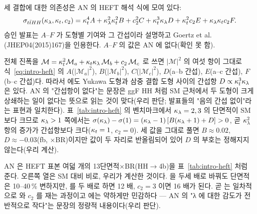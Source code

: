 세 결합에 대한 의존성은 AN 의 HEFT 해석 식에 모여 있다:
\begin{equation}
  \sigma_{t\bar{t}HH}(\kappa_{\lambda},\kappa_{t},c_2) = \kappa_{t}^{4}A + \kappa_{\lambda}^{2}\kappa_{t}^{2}B + c_2^{2}C + \kappa_{t}^{3}\kappa_{\lambda} D + \kappa_{t}^{2}c_2E + \kappa_{\lambda}\kappa_{t} c_2F .
  \label{eq:intro-heft}
\end{equation}
승인 발표는 $A$--$F$ 가 도형별 기여와 그 간섭이라 설명하고 Goertz et al.(JHEP04(2015)167)을 인용한다. $A$--$F$ 의 값은 AN 에 없다(확인 못 함).

\begin{note}
전체 진폭을 $\mathcal{M}=\kappa_{t}^{2}\mathcal{M}_a+\kappa_{t}\kappa_{\lambda}\,\mathcal{M}_b+c_2\,\mathcal{M}_c$ 로 쓰면 $|\mathcal{M}|^{2}$ 의 여섯 항이 그대로 식~\eqref{eq:intro-heft} 의
$A$($|\mathcal{M}_a|^2$), $B$($|\mathcal{M}_b|^2$), $C$($|\mathcal{M}_c|^2$), $D$(a–b 간섭), $E$(a–c 간섭), $F$(b–c 간섭)다. 따라서 \ttHH 에도 Yukawa 도형과
삼중 결합 도형 사이의 간섭항 $D\propto\kappa_{t}^{3}\kappa_{\lambda}$ 은 있다. AN 의 "간섭항이 없다"는 문장은 ggF HH 처럼 SM 근처에서 두 도형이 크게 상쇄하는 일이
없다는 뜻으로 읽는 것이 맞다(우리 판단; 발표들의 "음의 간섭 없이"라는 표현과 일치한다). 표~\ref{tab:intro-heft} 의 벤치마크에서 $\kappa_{\lambda}=2,3$ 의
단면적이 SM 보다 크므로 $\kappa_{\lambda}>1$ 쪽에서는 $\sigma(\kappa_{\lambda})-\sigma(1)=(\kappa_{\lambda}-1)\,[B(\kappa_{\lambda}+1)+D]>0$, 곧 $\kappa_{\lambda}^{2}$ 항의 증가가 간섭항보다 크다($\kappa_{t}=1$, $c_2=0$).
세 값을 그대로 풀면 $B\approx0.02$, $D\approx-0.03$(fb, $\times$BR)이지만 값이 두 자리로 반올림되어 있어 $D$ 의 부호는 정해지지 않는다(우리 계산).
\end{note}

AN 은 HEFT 표본 여덟 개의 13\TeV 단면적$\times$BR(HH$\to$4b)을 표~\ref{tab:intro-heft} 처럼 준다. 오른쪽 열은 SM 대비 비로, 우리가 계산한 것이다.
\kl 을 두세 배로 바꿔도 단면적은 10--40\,\% 변하지만, \kt 를 두 배로 하면 12 배, $c_2=3$ 이면 16 배가 된다. 곧 \ttHH 는 일차적으로 \kt 와 $c_2$ 를
재는 과정이고 \kl 에는 약하게만 민감하다 — AN 의 "λ 에 대한 감도가 전반적으로 작다"는 문장의 정량적 내용이다(우리 판단).

